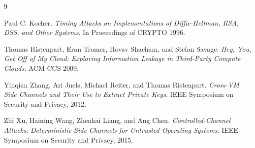 \documentclass[11pt]{article}
\begin{document}
\begin{thebibliography}{9}

Paul C. Kocher.
\textit{Timing Attacks on Implementations of Diffie-Hellman, RSA, DSS, and Other Systems}.
In Proceedings of CRYPTO 1996.

Thomas Ristenpart, Eran Tromer, Hovav Shacham, and Stefan Savage.
\textit{Hey, You, Get Off of My Cloud: Exploring Information Leakage in Third-Party Compute Clouds}.
ACM CCS 2009.

Yinqian Zhang, Ari Juels, Michael Reiter, and Thomas Ristenpart.
\textit{Cross-VM Side Channels and Their Use to Extract Private Keys}.
IEEE Symposium on Security and Privacy, 2012.

Zhi Xu, Haining Wang, Zhenkai Liang, and Ang Chen.
\textit{Controlled-Channel Attacks: Deterministic Side Channels for Untrusted Operating Systems}.
IEEE Symposium on Security and Privacy, 2015.

\end{thebibliography}
\end{document}
